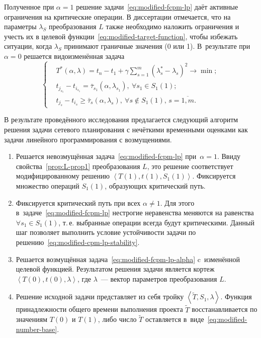 Полученное при $\alpha=1$ решение задачи~\eqref{eq:modified-fcpm-lp} даёт активные ограничения на критические операции. В диссертации отмечается, что на параметры $\lambda_S$ преобразования $L$ также необходимо наложить ограничения и учесть их в целевой функции~\eqref{eq:modified-target-function}, чтобы избежать ситуации, когда $\lambda_S$ принимают граничные значения (0 или 1). В~результате при $\alpha=0$ решается видоизменённая задача
\begin{equation}
\label{eq:modified-fcpm-lp-alpha}
  \left \{ \begin{aligned}
    & T^* \left(\alpha, \lambda \right) = t_n-t_1+\gamma \sum \limits_{s=1}^{m} \left(\lambda_s^*-\lambda_s \right)^2 \to \min; \\
    & t_{j_{s_1}}-t_{i_{s_1}} = \bar{\tau}_{s_1}\left(\alpha, \lambda_{s_1} \right),\ \forall s_1 \in S_1\left(1\right); \\
    & t_{j_s}-t_{i_s} \geqslant \bar{\tau}_s\left(\alpha, \lambda_s \right),\ \forall s \notin S_1\left(1\right),\,s=\overline{1,m}.
  \end{aligned} \right.
\end{equation}

В результате проведённого исследования предлагается следующий алгоритм решения задачи сетевого планирования с нечёткими временными оценками как задачи линейного программирования с возмущениями.
\begin{enumerate}
  \item Решается невозмущённая задача~\eqref{eq:modified-fcpm-lp} при~$\alpha=1$. Ввиду свойства~\ref{prop:L-prop1} преобразования $L$, это решение соответствует модифицированному решению $\left \langle T\left(1\right), t\left(1\right), S_1\left(1\right) \right \rangle$. Фиксируется множество операций $S_1\left(1\right)$, образующих критический путь.
  \item Фиксируется критический путь при всех $\alpha \neq 1$. Для этого в~задаче~\eqref{eq:modified-fcpm-lp} нестрогие неравенства меняются на равенства $\forall s_1 \in S_1\left(1\right)$, т.\,е. выбранные операции всегда будут критическими. Данный шаг позволяет выполнить условие устойчивости задачи по решению~\eqref{eq:modified-cpm-lp-stability}.
  \item Решается возмущённая задача~\eqref{eq:modified-fcpm-lp-alpha} c~изменённой целевой функцией. Результатом решения задачи является кортеж $\left \langle T\left(0\right), t\left(0\right), \lambda \right \rangle$, где $\lambda$~--- вектор параметров преобразования $L$.
  \item Решение исходной задачи представляет из себя тройку $\left \langle \tilde T, S_1, \lambda \right \rangle$. Функция принадлежности общего времени выполнения проекта $\tilde T$ восстанавливается по значениям $T\left(0\right)$ и $T\left(1\right)$, либо число $\tilde T$ оставляется в~виде~\eqref{eq:modified-number-base}.
\end{enumerate}

